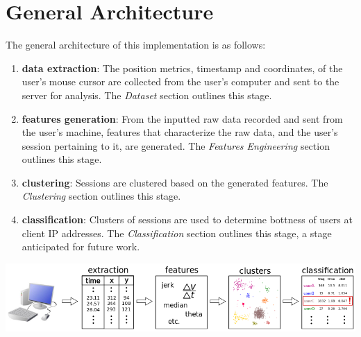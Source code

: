 
\section{General Architecture}\label{sec:general-arcitecture}
The general architecture of this implementation is as follows:
\begin{enumerate}
    \item \textbf{data extraction}: The position metrics, timestamp and coordinates, of the user's mouse cursor are collected from the user's computer and sent to the server for analysis. The \textit{Dataset} section outlines this stage.
    \item \textbf{features generation}: From the inputted raw data recorded and sent from the user's machine, features that characterize the raw data, and the user's session pertaining to it, are generated. The \textit{Features Engineering} section outlines this stage.
    \item \textbf{clustering}: Sessions are clustered based on the generated features. The \textit{Clustering} section outlines this stage.
    \item \textbf{classification}: Clusters of sessions are used to determine bottness of users at client IP addresses. The \textit{Classification} section outlines this stage, a stage anticipated for future work.
\end{enumerate}
\begin{center}
\includegraphics[width=1\columnwidth]{figures/general_architecture}
\end{center}

